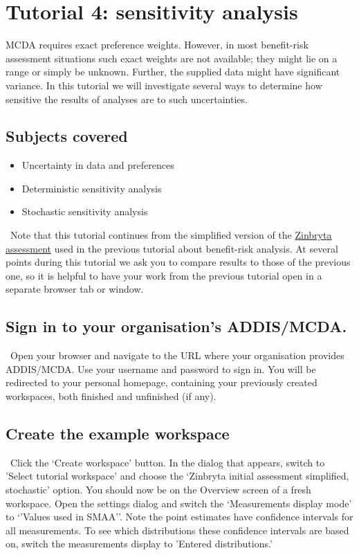\documentclass[00_mcda_tutorial.tex]{subfiles}
\begin{document}
\section*{Tutorial 4: sensitivity analysis}
\addtocounter{section}{1}

MCDA requires exact preference weights. However, in most benefit-risk assessment situations such exact weights are not available; they might lie on a range or simply be unknown. Further, the supplied data might have significant variance. In this tutorial we will investigate several ways to determine how sensitive the results of analyses are to such uncertainties.

\subsection*{Subjects covered}
\begin{itemize}
    \item Uncertainty in data and preferences
    \item Deterministic sensitivity analysis
    \item Stochastic sensitivity analysis
\end{itemize}

\noindent \faExclamationTriangle \, Note that this tutorial continues from the simplified version of the \href{https://www.ema.europa.eu/en/medicines/human/EPAR/zinbryta#authorisation-details-section}{Zinbryta assessment} used in the previous tutorial about benefit-risk analysis. At several points during this tutorial we ask you to compare results to those of the previous one, so it is helpful to have your work from the previous tutorial open in a separate browser tab or window.

\subsection*{Sign in to your organisation's ADDIS/MCDA.}
\leftpointright \, Open your browser and navigate to the URL where your organisation provides ADDIS/MCDA.
Use your username and password to sign in.
You will be redirected to your personal homepage, containing your previously created workspaces, both finished and unfinished (if any).

\subsection*{Create the example workspace}
\leftpointright \, Click the ‘Create workspace’ button. In the dialog that appears, switch to 'Select tutorial workspace' and choose the ‘Zinbryta initial assessment simplified, stochastic’ option. You should now be on the Overview screen of a fresh workspace. Open the settings dialog and switch the ‘Measurements display mode’ to ‘'Values used in SMAA'’. Note the point estimates have confidence intervals for all measurements. To see which distributions these confidence intervals are based on, switch the measurements display to 'Entered distributions.'
\newline
\end{document}
